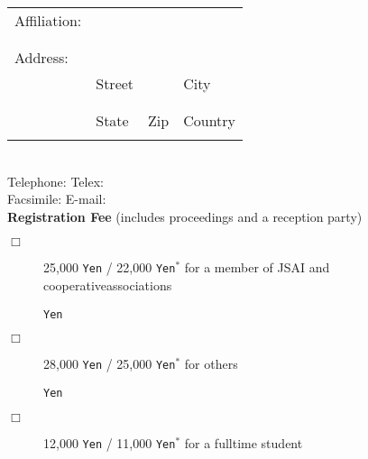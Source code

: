 \begin{small}
\begin{tabular}{llll}
Affiliation: &                 &                &                  \\
\cline{2-4}
             &                 &                &                  \\
             &                 &                &                  \\
Address:     &                 &                &                  \\
\cline{2-4}
             & {\footnotesize Street} &                & {\footnotesize City}    \\
             &                 &                &                  \\
             &                 &                &                  \\
\cline{2-4}
             & {\footnotesize State}  & {\footnotesize Zip}   & {\footnotesize Country} \\
             &                 &                &                  \\
\end{tabular}
\vspace{1.0mm}\\
\hspace*{1mm}
Telephone: \underline{\hspace{29mm}} \hfill Telex: \underline{\hspace{29mm}}\vspace{5mm}\\
\hspace*{1mm}
Facsimile: \underline{\hspace{29mm}} \hfill E-mail: \underline{\hspace{29mm}}\vspace{3mm}\\
\noindent
{\normalsize {\bf Registration Fee}} (includes proceedings and a reception party)
\begin{description}
\item [$\Box$] 25,000 {\tt Yen} / 22,000 {\tt Yen}$^*$ for a member
of JSAI and cooperative\linebreak[4]
associations\par
\hfill \underline{\hspace{30mm}} {\tt Yen}
\item [$\Box$] 28,000 {\tt Yen} / 25,000 {\tt Yen}$^*$ for others\par
\hfill \underline{\hspace{30mm}} {\tt Yen}
\item [$\Box$] 12,000 {\tt Yen} / 11,000 {\tt Yen}$^*$ for a fulltime student\par

\end{description}
\end{small}
